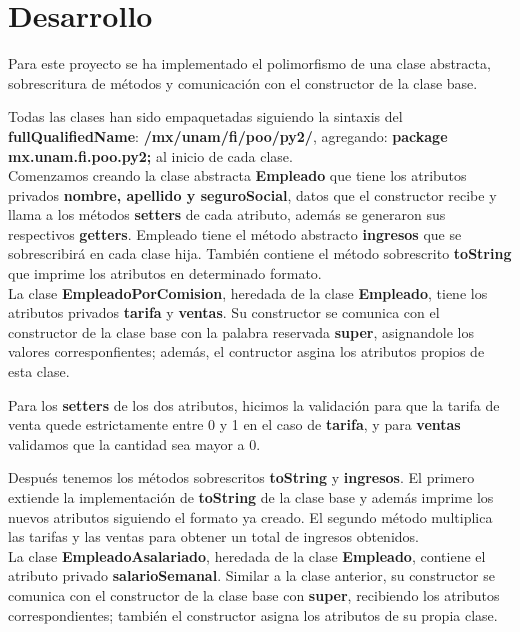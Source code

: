 \documentclass[letterpaper,12pt]{article}
\begin{document}
\section{Desarrollo}

Para este proyecto se ha implementado el polimorfismo de una clase abstracta, sobrescritura de métodos y comunicación con el constructor de la clase base.

Todas las clases han sido empaquetadas siguiendo la sintaxis del \textbf{fullQualifiedName}: \textbf{/mx/unam/fi/poo/py2/}, agregando: \textbf{package mx.unam.fi.poo.py2;} al inicio de cada clase.\\

Comenzamos creando la clase abstracta \textbf{Empleado} que tiene los atributos privados \textbf{nombre, apellido y seguroSocial}, datos que el constructor recibe y llama a los métodos \textbf{setters} de cada atributo, además se generaron sus respectivos \textbf{getters}. Empleado tiene el método abstracto \textbf{ingresos} que se sobrescribirá en cada clase hija.
También contiene el método sobrescrito \textbf{toString} que imprime los atributos en determinado formato.\\

La clase \textbf{EmpleadoPorComision}, heredada de la clase \textbf{Empleado}, tiene los atributos privados \textbf{tarifa} y \textbf{ventas}. Su constructor se comunica con el constructor de la clase base con la palabra reservada \textbf{super}, asignandole los valores corresponfientes; además, el contructor asgina los atributos propios de esta clase. 

Para los \textbf{setters} de los dos atributos, hicimos la validación para que la tarifa de venta quede estrictamente entre 0 y 1 en el caso de \textbf{tarifa}, y para \textbf{ventas} validamos que la cantidad sea mayor a 0. 

Después tenemos los métodos sobrescritos \textbf{toString} y \textbf{ingresos}. El primero extiende la implementación de \textbf{toString} de la clase base y además imprime los nuevos atributos siguiendo el formato ya creado. El segundo método multiplica las tarifas y las ventas para obtener un total de ingresos obtenidos.\\

La clase \textbf{EmpleadoAsalariado}, heredada de la clase \textbf{Empleado}, contiene el atributo privado \textbf{salarioSemanal}. Similar a la clase anterior, su constructor se comunica con el constructor de la clase base con \textbf{super}, recibiendo los atributos correspondientes; también el constructor asigna los atributos de su propia clase. 
\end{document}
